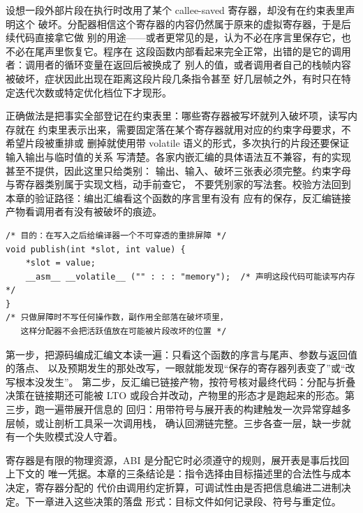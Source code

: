 \documentclass[12pt,a4paper,fontset=fandol]{ctexbook}
\newcommand{\Mx}[1]{\textsf{#1}}
\begin{document}
\begin{abibox}[title={破坏 callee-saved 的片段：症状为什么出现在无关位置}]
设想一段外部片段在执行时改用了某个 callee-saved 寄存器，却没有在约束表里声明这个
破坏。分配器相信这个寄存器的内容仍然属于原来的虚拟寄存器，于是后续代码直接拿它做
别的用途——或者更常见的是，认为不必在序言里保存它，也不必在尾声里恢复它。程序在
这段函数内部看起来完全正常，出错的是它的调用者：调用者的循环变量在返回后被换成了
别人的值，或者调用者自己的栈帧内容被破坏，症状因此出现在距离这段片段几条指令甚至
好几层帧之外，有时只在特定迭代次数或特定优化档位下才现形。

正确做法是把事实全部登记在约束表里：哪些寄存器被写坏就列入破坏项，读写内存就在
约束里表示出来，需要固定落在某个寄存器就用对应的约束字母要求，不希望片段被重排或
删掉就使用带 volatile 语义的形式，多次执行的片段还要保证输入输出与临时值的关系
写清楚。各家内嵌汇编的具体语法互不兼容，有的实现甚至不提供，因此这里只给类别：
输出、输入、破坏三张表必须完整。约束字母与寄存器类别属于实现文档，动手前查它，
不要凭别家的写法套。校验方法回到本章的验证路径：编出汇编看这个函数的序言里有没有
应有的保存，反汇编链接产物看调用者有没有被破坏的痕迹。
\end{abibox}

\begin{lstlisting}[style=cstyle, caption={约束表要如实登记副作用（GNU 家族风格示意，其他实现语法不同）}]
/* 目的：在写入之后给编译器一个不可穿透的重排屏障 */
void publish(int *slot, int value) {
    *slot = value;
    __asm__ __volatile__ ("" : : : "memory");  /* 声明这段代码可能读写内存 */
}
/* 只做屏障时不写任何操作数，副作用全部落在破坏项里，
   这样分配器不会把活跃值放在可能被片段改坏的位置 */
\end{lstlisting}

\begin{bestpractice}[title={改档位或加内联汇编后的最小验证三步}]
第一步，把源码编成汇编文本读一遍：只看这个函数的序言与尾声、参数与返回值的落点、
以及预期发生的那处改写，一眼就能发现“保存的寄存器列表变了”或“改写根本没发生”。
第二步，反汇编已链接产物，按符号核对最终代码：分配与折叠决策在链接期还可能被
\Mx{LTO} 或段合并改动，产物里的形态才是跑起来的形态。第三步，跑一遍带展开信息的
回归：用带符号与展开表的构建触发一次异常穿越多层帧，或让剖析工具采一次调用栈，
确认回溯链完整。三步各查一层，缺一步就有一个失败模式没人守着。
\end{bestpractice}

寄存器是有限的物理资源，\Mx{ABI} 是分配它时必须遵守的规则，展开表是事后找回上下文的
唯一凭据。本章的三条结论是：指令选择由目标描述里的合法性与成本决定，寄存器分配的
代价由调用约定折算，可调试性由是否把信息编进二进制决定。下一章进入这些决策的落盘
形式：目标文件如何记录段、符号与重定位。
\end{document}
